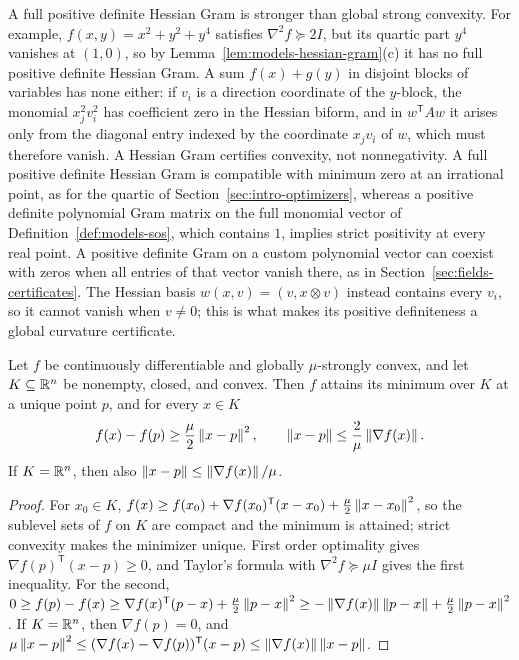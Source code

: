 \begin{remark}
\label{rem:models-gram-kinds}
A full positive definite Hessian Gram is stronger than global strong
convexity. For example, $f(x,y)=x^2+y^2+y^4$ satisfies
$\nabla^2f\succeq2I$, but its quartic part $y^4$ vanishes at $(1,0)$, so by
Lemma~\ref{lem:models-hessian-gram}(c) it has no full positive definite Hessian
Gram. A sum $f(x)+g(y)$ in disjoint blocks of variables has none either: if
$v_i$ is a direction coordinate of the $y$-block, the monomial $x_j^2v_i^2$
has coefficient zero in the Hessian biform, and in $w^{\mathsf T}Aw$ it arises
only from the diagonal entry indexed by the coordinate $x_jv_i$ of $w$, which
must therefore vanish. A Hessian Gram certifies convexity, not
nonnegativity. A full positive definite Hessian Gram is compatible with
minimum zero at an irrational point, as for the quartic of
Section~\ref{sec:intro-optimizers}, whereas a positive definite polynomial
Gram matrix on the full monomial vector of
Definition~\ref{def:models-sos}, which contains $1$, implies strict
positivity at every real point. A positive definite Gram on a custom
polynomial vector can coexist with zeros when all entries of that vector
vanish there, as in Section~\ref{sec:fields-certificates}. The Hessian basis
$w(x,v)=(v,x\otimes v)$ instead contains every $v_i$, so it cannot vanish
when $v\ne0$; this is what makes its positive definiteness a global curvature
certificate.
\end{remark}

\begin{lemma}
\label{lem:models-strong-convexity}
Let $f$ be continuously differentiable and globally $\mu$-strongly convex,
and let $K\subseteq\mathbb R^n$ be nonempty, closed, and convex. Then $f$ attains its
minimum over $K$ at a unique point $p$, and for every $x\in K$
\[
f(x)-f(p)\ge\frac\mu2\left\lVert x-p\right\rVert^2,
\qquad
\left\lVert x-p\right\rVert\le\frac2\mu\left\lVert\nabla f(x)\right\rVert.
\]
If $K=\mathbb R^n$, then also $\left\lVert x-p\right\rVert\le\left\lVert\nabla f(x)\right\rVert/\mu$.
\end{lemma}

\begin{proof}
For $x_0\in K$, $f(x)\ge f(x_0)+\nabla f(x_0)^{\mathsf T}(x-x_0)
+\frac\mu2\left\lVert x-x_0\right\rVert^2$, so the sublevel sets of $f$ on $K$ are compact and
the minimum is attained; strict convexity makes the minimizer unique. First
order optimality gives $\nabla f(p)^{\mathsf T}(x-p)\ge0$, and Taylor's
formula with $\nabla^2f\succeq\mu I$ gives the first inequality. For the
second,
$0\ge f(p)-f(x)\ge\nabla f(x)^{\mathsf T}(p-x)+\frac\mu2\left\lVert p-x\right\rVert^2
\ge-\left\lVert\nabla f(x)\right\rVert\left\lVert p-x\right\rVert+\frac\mu2\left\lVert p-x\right\rVert^2$. If $K=\mathbb R^n$, then
$\nabla f(p)=0$, and
$\mu\left\lVert x-p\right\rVert^2\le(\nabla f(x)-\nabla f(p))^{\mathsf T}(x-p)
\le\left\lVert\nabla f(x)\right\rVert\left\lVert x-p\right\rVert$.
\end{proof}

